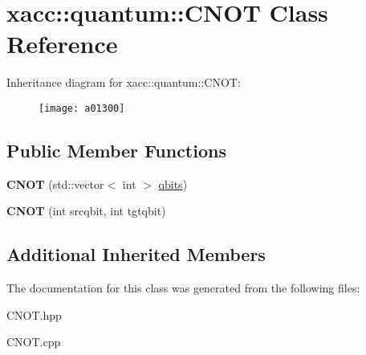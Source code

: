 \hypertarget{a01300}{}\section{xacc\+:\+:quantum\+:\+:C\+N\+OT Class Reference}
\label{a01300}
Inheritance diagram for xacc\+:\+:quantum\+:\+:C\+N\+OT\+:\begin{figure}[H]
\begin{center}
\leavevmode
\texttt{[image: a01300]}
\end{center}
\end{figure}
\subsection*{Public Member Functions}
\begin{DoxyCompactItemize}
\item 
\mbox{\label{a01300_ad3d460779a27affa317dd4f3a88268b3}} 
{\bfseries C\+N\+OT} (std\+::vector$<$ int $>$ \hyperlink{a01276_a2a56be6c2519ea65df4d06f4abae1393}{qbits})
\item 
\mbox{\label{a01300_a15efcb44477dde4b6151fe1776a73ddc}} 
{\bfseries C\+N\+OT} (int srcqbit, int tgtqbit)
\end{DoxyCompactItemize}
\subsection*{Additional Inherited Members}


The documentation for this class was generated from the following files\+:\begin{DoxyCompactItemize}
\item 
C\+N\+O\+T.\+hpp\item 
C\+N\+O\+T.\+cpp\end{DoxyCompactItemize}
